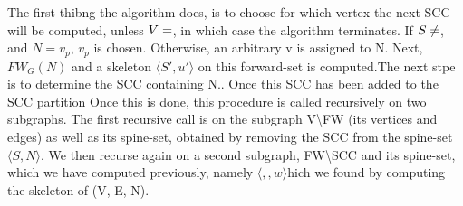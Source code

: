 \documentclass[../master.tex]{subfiles}
\newcommand{\FW}[2][G]{\ensuremath{FW_{#1}(#2)}}
\newcommand{\pair}[2]{\ensuremath{\langle #1, #2\rangle}}
\begin{document}
The first thibng the algorithm does, is to choose for which vertex the next SCC will be computed, unless $V=\empty$, in which case the algorithm terminates. If $S\neq\empty$, and $N={v_p}$, $v_p$ is chosen. Otherwise, an arbitrary v is assigned to N. Next, \FW{N} and a skeleton \pair{S'}{u'} on this forward-set is computed.The next stpe is to determine the SCC containing N.. Once this SCC has been added to the SCC partition 
Once this is done, this procedure is called recursively on two subgraphs. The first recursive call is on the subgraph V\textbackslash FW (its vertices and edges) as well as its spine-set, obtained by removing the SCC from the spine-set $\langle S, N\rangle$. We then recurse again on a second subgraph, FW\textbackslash SCC and its spine-set, which we have computed previously, namely \pair, which we found by computing the skeleton of (V, E, N).

\end{document}
